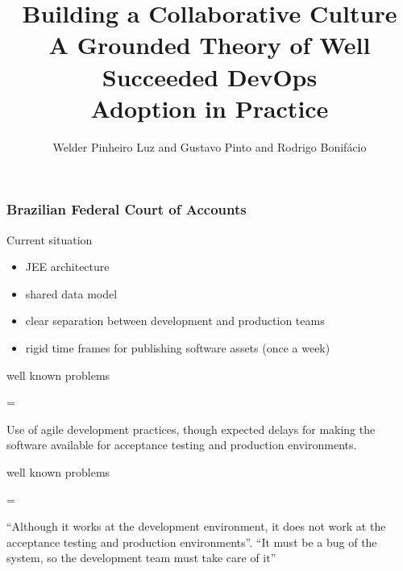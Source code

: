 \documentclass{beamer}
\title{Building a Collaborative Culture \\ A Grounded Theory of Well Succeeded DevOps \\ Adoption in Practice}
\author{Welder Pinheiro Luz and Gustavo Pinto and Rodrigo Bonif\'{a}cio}
\newenvironment{warning}
  {\par\begin{mdframed}[linewidth=1pt,linecolor=celestialblue]%
    \begin{list}{}{\leftmargin=1cm
                   \labelwidth=\leftmargin}\item[\Large\danger]}
               {\end{list}\end{mdframed}\par}
\begin{document}
\begin{frame}
 \titlepage
\end{frame}

\begin{frame}

\end{frame}


\begin{frame}
  \frametitle{Brazilian Federal Court of Accounts}

  \begin{block}{Current situation}
  \begin{itemize}
    \item JEE architecture 
    \item shared data model
    \item clear separation between development and production teams
    \item rigid time frames for publishing software assets (once a week)  
  \end{itemize}
  \end{block}
  
\end{frame}

\begin{frame}
  \begin{center}
    \begin{huge}
      well known problems 
    \end{huge}
  \end{center}
  \pause
  
  \begin{warning}
    Use of agile development practices, though expected delays
    for making the software available for acceptance
    testing and production environments. 
  \end{warning}
  
\end{frame}


\begin{frame}
  \begin{center}
    \begin{huge}
      well known problems 
    \end{huge}
  \end{center}
  \pause
  
  \begin{warning}
    ``Although it works at the development environment, it does not
      work at the acceptance testing and production environments''. \pause
      ``It must be a bug of the system, so the development team must
      take care of it'' 
  \end{warning}
  
\end{frame}
\end{document}
